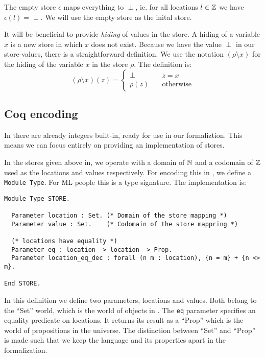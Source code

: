 The empty store $\epsilon$ maps everything to $\perp$, ie. for all
locations $l \in \mathbb{Z}$ we have $\epsilon(l) = \perp$. We will use the
empty store as the inital store.

It will be beneficial to provide \emph{hiding} of values in the store. A
hiding of a variable $x$ is a new store in which $x$ does not
exist. Because we have the value $\perp$ in our store-values, there is
a straightforward definition. We use the notation $(\rho \setminus x)$
for the hiding of the variable $x$ in the store $\rho$. The definition
is:
\begin{equation*}
  (\rho \setminus x)(z) = \begin{cases}
    \perp & \quad z = x\\
    \rho(z) & \quad \text{otherwise}
  \end{cases}
\end{equation*}

\subsection{Coq encoding}

In \coq{} there are already integers built-in, ready for use in our
formaliztion. This means we can focus entirely on providing an
implementation of stores.

In the stores given above in, we operate with a domain of $\mathbb{N}$ and a
codomain of $\mathbb{Z}$ used as the locations and values respectively. For
encoding this in \coq{}, we define a \texttt{Module Type}. For ML
people this is a type signature. The implementation is:
\begin{verbatim}
Module Type STORE.

  Parameter location : Set. (* Domain of the store mapping *)
  Parameter value : Set.    (* Codomain of the store mappring *)

  (* locations have equality *)
  Parameter eq : location -> location -> Prop.
  Parameter location_eq_dec : forall (n m : location), {n = m} + {n <> m}.

End STORE.
\end{verbatim}
In this definition we define two parameters, locations and
values. Both belong to the ``Set'' world, which is the world of
objects in \coq{}. The \texttt{eq} parameter specifies an equality
predicate on locations. It returns its result as a ``Prop'' which is
the world of propositions in the universe. The distinction between
``Set'' and ``Prop'' is made such that we keep the language and its
properties apart in the formalization.

